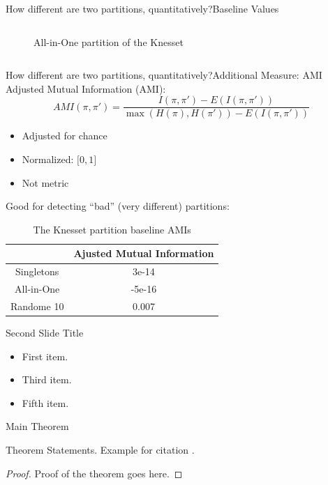 \documentclass[xcolor=dvipsnames]{beamer}
\newcommand{\AMI}{\mathit{AMI}}
\begin{document}
\begin{frame}{How different are two partitions, quantitatively?}{Baseline Values}
\begin{columns}
\begin{figure}
    \caption{All-in-One partition of the Knesset}
  \end{figure}
  \end{columns}
\end{frame}

\begin{frame}{How different are two partitions, quantitatively?}{Additional Measure: AMI}
  Adjusted Mutual Information (AMI):
  \[
    \AMI(\pi, \pi') = \frac{I(\pi, \pi') - E(I(\pi, \pi'))}{\max(H(\pi), H(\pi')) - E(I(\pi, \pi'))}
  \]
  \begin{itemize}
    \item Adjusted for chance
    \item Normalized: $\lbrack0, 1\rbrack$
    \item Not metric
  \end{itemize}

  Good for detecting ``bad'' (very different) partitions:
  \begin{table}[h]
  \centering
  \begin{tabular}{|c|c|}
  \hline
         & Ajusted Mutual Information \\ \hline
  Singletons & 3e-14 \\
  All-in-One & -5e-16 \\
  Randome 10 & 0.007 \\
  \hline
  \end{tabular}
  \caption{The Knesset partition baseline AMIs}
  \end{table}
\end{frame}

\begin{frame}{Second Slide Title}
  \begin{itemize}
  \item {
    First item.
    \pause %
  }
  \item<3-> {
    Third item.
  }
  \item<5-> {
    Fifth item. 
  }
  \end{itemize}
\end{frame}

\begin{frame}{Main Theorem}
\begin{theorem}
Theorem Statements. Example for citation \cite{Author1990}.
\end{theorem}

\begin{proof}
Proof of the theorem goes here.
\end{proof}
\end{frame}
\end{document}
